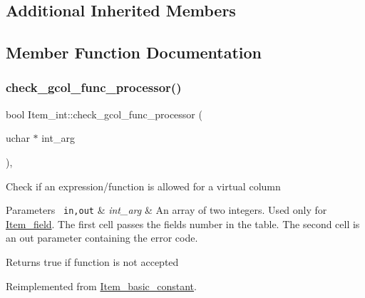 \subsection*{Additional Inherited Members}


\subsection{Member Function Documentation}
\mbox{\label{classItem__int_ae1ea6b10f3987835fc6d7ec45bb11f94}} 
\subsubsection{\texorpdfstring{check\+\_\+gcol\+\_\+func\+\_\+processor()}{check\_gcol\_func\_processor()}}
{\footnotesize\ttfamily bool Item\+\_\+int\+::check\+\_\+gcol\+\_\+func\+\_\+processor (\begin{DoxyParamCaption}\item[{uchar $\ast$}]{int\+\_\+arg }\end{DoxyParamCaption})\hspace{0.3cm}{\ttfamily [inline]}, {\ttfamily [virtual]}}

Check if an expression/function is allowed for a virtual column


\begin{DoxyParams}[1]{Parameters}
\mbox{\texttt{ in,out}}  & {\em int\+\_\+arg} & An array of two integers. Used only for \mbox{\hyperlink{classItem__field}{Item\+\_\+field}}. The first cell passes the field\textquotesingle{}s number in the table. The second cell is an out parameter containing the error code.\\
\hline
\end{DoxyParams}
\begin{DoxyReturn}{Returns}
true if function is not accepted 
\end{DoxyReturn}


Reimplemented from \mbox{\hyperlink{classItem__basic__constant_a6240f3253090d2fc91f87a7a1cb773a7}{Item\+\_\+basic\+\_\+constant}}.

\mbox{\label{classItem__int_a75d827818558edd68522d1823a1fc803}} 

